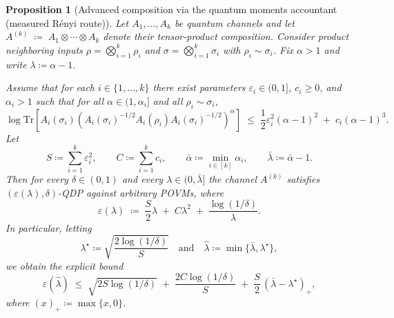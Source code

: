 \documentclass[11pt]{article}
\def\Tr{\mathrm{Tr}}
\theoremstyle{plain}
\newtheorem{proposition}[theo]{Proposition}
\theoremstyle{remark}
\begin{document}
\begin{proposition}[Advanced composition via the quantum moments accountant (measured R\'enyi route)]
\label{prop:thm1-from-qma}
Let $A_1,\ldots,A_k$ be quantum channels and let
$
A^{(k)} \;\coloneqq\; A_1\otimes\cdots\otimes A_k
$
denote their tensor-product composition. Consider product neighboring inputs
$\rho=\bigotimes_{i=1}^k \rho_i$ and $\sigma=\bigotimes_{i=1}^k \sigma_i$ with $\rho_i\sim\sigma_i$.
Fix $\alpha>1$ and write $\lambda\coloneqq\alpha-1$.

Assume that for each $i\in\{1,\ldots,k\}$ there exist parameters $\varepsilon_i\in(0,1]$,
$c_i\ge 0$, and $\alpha_i>1$ such that for all $\alpha\in(1,\alpha_i]$ and all $\rho_i\sim\sigma_i$,
\begin{equation}
\label{eq:qma-small-lambda-assumption}
\log \Tr\!\left[
A_i(\sigma_i)\left(A_i(\sigma_i)^{-1/2}A_i(\rho_i)A_i(\sigma_i)^{-1/2}\right)^{\alpha}
\right]
\;\le\;
\frac{1}{2}\varepsilon_i^2(\alpha-1)^2 \;+\; c_i(\alpha-1)^3.
\end{equation}
Let
\[
S \coloneqq \sum_{i=1}^k \varepsilon_i^2,
\qquad
C \coloneqq \sum_{i=1}^k c_i,
\qquad
\bar\alpha \coloneqq \min_{i\in[k]} \alpha_i,
\qquad
\bar\lambda \coloneqq \bar\alpha-1.
\]
Then for every $\delta\in(0,1)$ and every $\lambda\in(0,\bar\lambda]$ the channel $A^{(k)}$
satisfies $(\varepsilon(\lambda),\delta)$-QDP against \emph{arbitrary} POVMs, where
\begin{equation}
\label{eq:eps-lambda-updated}
\varepsilon(\lambda)
\;\coloneqq\;
\frac{S}{2}\lambda \;+\; C\lambda^2 \;+\; \frac{\log(1/\delta)}{\lambda}.
\end{equation}
In particular, letting
\[
\lambda^\star \coloneqq \sqrt{\frac{2\log(1/\delta)}{S}}
\quad\text{and}\quad
\hat\lambda \coloneqq \min\{\bar\lambda,\lambda^\star\},
\]
we obtain the explicit bound
\begin{equation}
\label{eq:eps-explicit-updated}
\varepsilon(\hat\lambda)
\;\le\;
\sqrt{2S\log(1/\delta)}
\;+\;
\frac{2C\log(1/\delta)}{S}
\;+\;
\frac{S}{2}\,(\bar\lambda-\lambda^\star)_+,
\end{equation}
where $(x)_+ \coloneqq \max\{x,0\}$.
\end{proposition}
\end{document}

